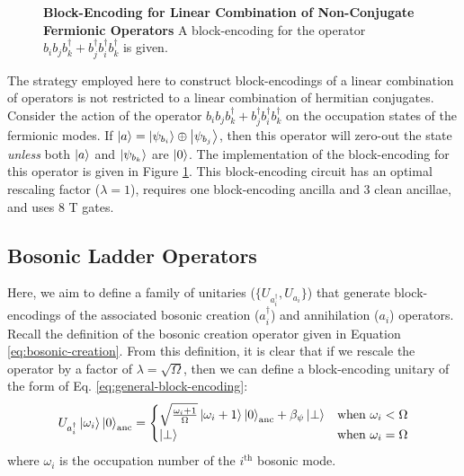\begin{figure}
    
    \caption{
        \textbf{Block-Encoding for Linear Combination of Non-Conjugate Fermionic Operators}
        A block-encoding for the operator $b_i b_j b_k^\dagger + b_j^\dagger b_i^\dagger b_k^\dagger$ is given.
    }
    \label{fig:fermionic-be-lc-not-conjugate}
\end{figure}


The strategy employed here to construct block-encodings of a linear combination of operators is not restricted to a linear combination of hermitian conjugates.
Consider the action of the operator $b_i b_j b_k^\dagger + b_j^\dagger b_i^\dagger b_k^\dagger$ on the occupation states of the fermionic modes.
If $\ket{a} = \ket{\psi_{b_i}} \oplus \ket{\psi_{b_j}}$, then this operator will zero-out the state \textit{unless} both $\ket{a}$ and $\ket{\psi_{b_k}}$ are $\ket{0}$.
The implementation of the block-encoding for this operator is given in Figure \ref{fig:fermionic-be-lc-not-conjugate}.
This block-encoding circuit has an optimal rescaling factor ($\lambda = 1$), requires one block-encoding ancilla and $3$ clean ancillae, and uses $8$ T gates.

\subsection{Bosonic Ladder Operators}

Here, we aim to define a family of unitaries ($\{U_{a^\dagger_i}, U_{a_i}\}$) that generate block-encodings of the associated bosonic creation ($a_i^\dagger$) and annihilation ($a_i$) operators.
Recall the definition of the bosonic creation operator given in Equation \ref{eq:bosonic-creation}.
From this definition, it is clear that if we rescale the operator by a factor of $\lambda = \sqrt{\Omega}$, then we can define a block-encoding unitary of the form of Eq. \ref{eq:general-block-encoding}: 
\begin{equation}
    \label{eq:be-bos-creation}
    U_{a^\dagger_i} \ket{\omega_i} \ket{0}_\text{anc} = 
    \begin{cases}
        \sqrt{\frac{\omega_i + 1}{\Omega}} \ket{\omega_i + 1} \ket{0}_\text{anc} + \beta_\psi \ket{\perp} & \text{when } \omega_i < \Omega \\
        \ket{\perp} & \text{when } \omega_i = \Omega \\
    
    \end{cases}
\end{equation}
where $\omega_i$ is the occupation number of the $i^\text{th}$ bosonic mode.

